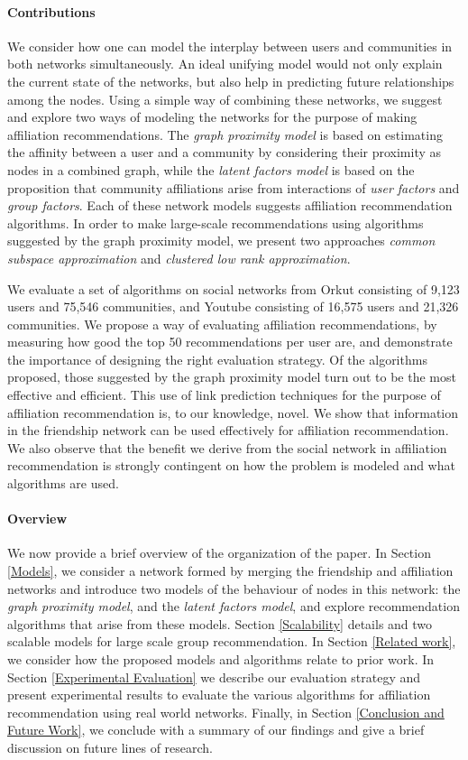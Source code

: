 \paragraph*{Contributions}
We consider how one can model the interplay between users and communities in both networks simultaneously. An ideal unifying model would not only explain the current state of the networks, but also help in predicting future relationships among the nodes. Using a simple way of combining these networks, we suggest and explore two ways of modeling the networks for the purpose of making affiliation recommendations. The \textit{graph proximity model} is based on estimating the affinity between a user and a community by considering their proximity as nodes in a combined graph, while the \textit{latent factors model} is based on the proposition that community affiliations arise from interactions of \textit{user factors} and \textit{group factors}. Each of these network models suggests affiliation recommendation algorithms. In order to make large-scale recommendations using algorithms suggested by the graph proximity model, we present two approaches \textit{common subspace approximation} and \textit{clustered low rank approximation}.

We evaluate a set of algorithms on social networks from Orkut consisting of 9,123 users and 75,546 communities, and Youtube consisting of 16,575 users and 21,326 communities. We propose a way of evaluating affiliation recommendations, by measuring how good the top 50 recommendations per user are, and demonstrate the importance of designing the right evaluation strategy. Of the algorithms proposed, those suggested by the graph proximity model turn out to be the most effective and efficient. This use of link prediction techniques for the purpose of affiliation recommendation is, to our knowledge, novel. We show that information in the friendship network can be used effectively for affiliation recommendation. We also observe that the benefit we derive from the social network in affiliation recommendation is strongly contingent on how the problem is modeled and what algorithms are used.

\paragraph*{Overview}
We now provide a brief overview of the organization of the paper. In Section \ref{Models}, we consider a network formed by merging the friendship and affiliation networks and introduce two models of the behaviour of nodes in this network: the \textit{graph proximity model}, and the \textit{latent factors model}, and explore recommendation algorithms that arise from these models. Section \ref{Scalability} details and two scalable models for large scale group recommendation. In Section \ref{Related work}, we consider how the proposed models and algorithms relate to prior work. In Section \ref{Experimental Evaluation} we describe our evaluation strategy and present experimental results to evaluate the various algorithms for affiliation recommendation using real world networks. Finally, in Section \ref{Conclusion and Future Work}, we conclude with a summary of our findings and give a brief discussion on future lines of research.


